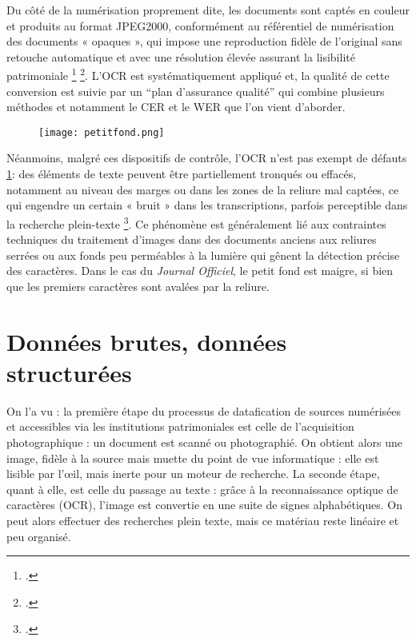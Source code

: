 Du côté de la numérisation proprement dite, les documents sont captés en couleur et produits au format JPEG2000, conformément au référentiel de numérisation des documents « opaques », qui impose une reproduction fidèle de l’original sans retouche automatique et avec une résolution élevée assurant la lisibilité patrimoniale \footcite[][]{bnfnumdemasse} \footcite[][]{refnumdocopaques}. L’OCR est systématiquement appliqué et, la qualité de cette conversion est suivie par un \enquote{plan d’assurance qualité} qui combine plusieurs méthodes et notamment le CER et le WER que l'on vient d'aborder. 

\begin{figure}[htbp]
\centering
\texttt{[image: petitfond.png]}
\caption{}
\label{fig:petitfond}
\end{figure}

Néanmoins, malgré ces dispositifs de contrôle, l’OCR n’est pas exempt de défauts \ref{fig:petitfond}: des éléments de texte peuvent être partiellement tronqués ou effacés, notamment au niveau des marges ou dans les zones de la reliure mal captées, ce qui engendre un certain « bruit » dans les transcriptions, parfois perceptible dans la recherche plein-texte \footcite[][]{qualitycontrolworkflow}. Ce phénomène est généralement lié aux contraintes techniques du traitement d’images dans des documents anciens aux reliures serrées ou aux fonds peu perméables à la lumière qui gênent la détection précise des caractères. Dans le cas du \emph{Journal Officiel}, le petit fond est maigre, si bien que les premiers caractères sont avalées par la reliure.

\chapter{Données brutes, données structurées}

On l'a vu : la première étape du processus de datafication de sources numérisées et accessibles via les institutions patrimoniales est celle de l’acquisition photographique : un document est scanné ou photographié. On obtient alors une image, fidèle à la source mais muette du point de vue informatique : elle est lisible par l’œil, mais inerte pour un moteur de recherche. La seconde étape, quant à elle, est celle du passage au texte : grâce à la reconnaissance optique de caractères (OCR), l’image est convertie en une suite de signes alphabétiques. On peut alors effectuer des recherches plein texte, mais ce matériau reste linéaire et peu organisé.

